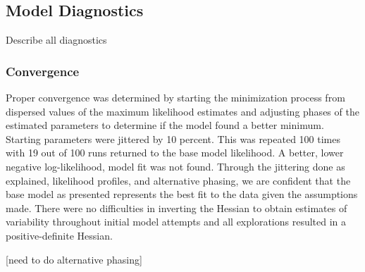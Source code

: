 \documentclass[11pt,
  english,
  a4paper,
]{article}
\begin{document}
\leavevmode\tagmcend\tagstructend\par


\hypertarget{model-diagnostics}{%
\subsection{Model Diagnostics}\label{model-diagnostics}}

\leavevmode\tagmcend\tagstructend


Describe all diagnostics

\leavevmode\tagmcend\tagstructend\par


\hypertarget{convergence}{%
\subsubsection{Convergence}\label{convergence}}

\leavevmode\tagmcend\tagstructend


Proper convergence was determined by starting the minimization process from dispersed values of the maximum likelihood estimates and adjusting phases of the estimated parameters to determine if the model found a better minimum. Starting parameters were jittered by 10 percent. This was repeated 100 times with 19 out of 100 runs returned to the base model likelihood. A better, lower negative log-likelihood, model fit was not found. Through the jittering done as explained, likelihood profiles, and alternative phasing, we are confident that the base model as presented represents the best fit to the data given the assumptions made. There were no difficulties in inverting the Hessian to obtain estimates of variability throughout initial model attempts and all explorations resulted in a positive-definite Hessian.

\leavevmode\tagmcend\tagstructend\par


{[}need to do alternative phasing{]}

\leavevmode\tagmcend\tagstructend\par
\end{document}
